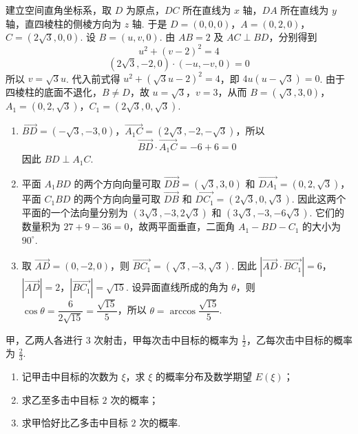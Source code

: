 \begin{solution}
建立空间直角坐标系，取 \(D\) 为原点，\(DC\) 所在直线为 \(x\) 轴，\(DA\) 所在直线为 \(y\) 轴，直四棱柱的侧棱方向为 \(z\) 轴. 于是 \(D=(0,0,0)\)，\(A=(0,2,0)\)，\(C=(2\sqrt{3},0,0)\). 设 \(B=(u,v,0)\). 由 \(AB=2\) 及 \(AC\perp BD\)，分别得到
\[
u^2+(v-2)^2=4
\]
\[
(2\sqrt{3},-2,0)\cdot(-u,-v,0)=0
\]
所以 \(v=\sqrt{3}u\). 代入前式得 \(u^2+(\sqrt{3}u-2)^2=4\)，即 \(4u(u-\sqrt{3})=0\). 由于四棱柱的底面不退化，\(B\ne D\)，故 \(u=\sqrt{3}\)，\(v=3\)，从而 \(B=(\sqrt{3},3,0)\)，\(A_1=(0,2,\sqrt{3})\)，\(C_1=(2\sqrt{3},0,\sqrt{3})\).

\begin{enumerate}
\item \(\overrightarrow{BD}=(-\sqrt{3},-3,0)\)，\(\overrightarrow{A_1C}=(2\sqrt{3},-2,-\sqrt{3})\)，所以
\[
\overrightarrow{BD}\cdot\overrightarrow{A_1C}=-6+6=0
\]
因此 \(BD\perp A_1C\).

\item 平面 \(A_1BD\) 的两个方向向量可取 \(\overrightarrow{DB}=(\sqrt{3},3,0)\) 和 \(\overrightarrow{DA_1}=(0,2,\sqrt{3})\)，平面 \(C_1BD\) 的两个方向向量可取 \(\overrightarrow{DB}\) 和 \(\overrightarrow{DC_1}=(2\sqrt{3},0,\sqrt{3})\). 因此这两个平面的一个法向量分别为 \((3\sqrt{3},-3,2\sqrt{3})\) 和 \((3\sqrt{3},-3,-6\sqrt{3})\).
它们的数量积为 \(27+9-36=0\)，故两平面垂直，二面角 \(A_1-BD-C_1\) 的大小为 \(90^\circ\).

\item 取 \(\overrightarrow{AD}=(0,-2,0)\)，则 \(\overrightarrow{BC_1}=(\sqrt{3},-3,\sqrt{3})\). 因此
\(\left|\overrightarrow{AD}\cdot\overrightarrow{BC_1}\right|=6\)，\(\left|\overrightarrow{AD}\right|=2\)，\(\left|\overrightarrow{BC_1}\right|=\sqrt{15}\).
设异面直线所成的角为 \(\theta\)，则 \(\cos\theta=\dfrac{6}{2\sqrt{15}}=\dfrac{\sqrt{15}}{5}\)，所以 \(\theta=\arccos\dfrac{\sqrt{15}}{5}\).
\end{enumerate}
\end{solution}

\begin{problem}
甲，乙两人各进行 \(3\) 次射击，甲每次击中目标的概率为 \(\frac{1}{2}\)，乙每次击中目标的概率为 \(\frac{2}{3}\).

\begin{enumerate}
\item 记甲击中目标的次数为 \(\xi\)，求 \(\xi\) 的概率分布及数学期望 \(E(\xi)\)；
\item 求乙至多击中目标 \(2\) 次的概率；
\item 求甲恰好比乙多击中目标 \(2\) 次的概率.
\end{enumerate}
\end{problem}

